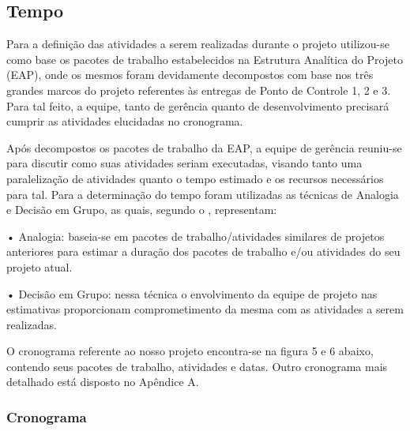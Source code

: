 \subsection{Tempo}

Para a definição das atividades a serem realizadas durante o projeto utilizou-se como base os pacotes de trabalho estabelecidos na Estrutura Analítica do Projeto (EAP),
onde os mesmos foram devidamente decompostos com base nos três grandes marcos do projeto referentes às entregas de Ponto de Controle 1, 2 e 3. Para tal feito, a equipe,
tanto de gerência quanto de desenvolvimento precisará cumprir as atividades elucidadas no cronograma.

Após decompostos os pacotes de trabalho da EAP, a equipe de gerência reuniu-se para discutir como suas atividades seriam executadas, visando tanto uma paralelização
de atividades quanto o tempo estimado e os recursos necessários para tal.
Para a determinação do tempo foram utilizadas as técnicas de Analogia e Decisão em Grupo, as quais, segundo o \cite{PMBK}, representam:

• Analogia: baseia-se em pacotes de trabalho/atividades similares de projetos anteriores para estimar a duração dos pacotes de trabalho e/ou atividades do seu projeto
atual.

• Decisão em Grupo: nessa técnica o envolvimento da equipe de projeto nas estimativas proporcionam comprometimento da mesma com as atividades a serem realizadas.

O cronograma referente ao nosso projeto encontra-se na figura 5 e 6 abaixo, contendo seus pacotes de trabalho, atividades e datas. Outro cronograma mais detalhado
está disposto no Apêndice A.


\newpage
\subsubsection{Cronograma}

